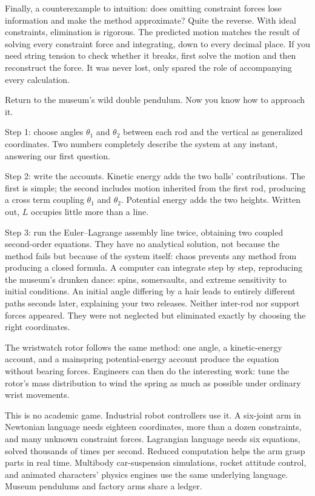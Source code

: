 \begin{mainline}
Finally, a counterexample to intuition: does omitting constraint forces lose information and make the method approximate? Quite the reverse. With ideal constraints, elimination is rigorous. The predicted motion matches the result of solving every constraint force and integrating, down to every decimal place. If you need string tension to check whether it breaks, first solve the motion and then reconstruct the force. It was never lost, only spared the role of accompanying every calculation.
\end{mainline}


\begin{mainline}
Return to the museum's wild double pendulum. Now you know how to approach it.

Step 1: choose angles \(\theta_1\) and \(\theta_2\) between each rod and the vertical as generalized coordinates. Two numbers completely describe the system at any instant, answering our first question.

Step 2: write the accounts. Kinetic energy adds the two balls' contributions. The first is simple; the second includes motion inherited from the first rod, producing a cross term coupling \(\theta_1\) and \(\theta_2\). Potential energy adds the two heights. Written out, \(L\) occupies little more than a line.

Step 3: run the Euler--Lagrange assembly line twice, obtaining two coupled second-order equations. They have no analytical solution, not because the method fails but because of the system itself: chaos prevents any method from producing a closed formula. A computer can integrate step by step, reproducing the museum's drunken dance: spins, somersaults, and extreme sensitivity to initial conditions. An initial angle differing by a hair leads to entirely different paths seconds later, explaining your two releases. Neither inter-rod nor support forces appeared. They were not neglected but eliminated exactly by choosing the right coordinates.

The wristwatch rotor follows the same method: one angle, a kinetic-energy account, and a mainspring potential-energy account produce the equation without bearing forces. Engineers can then do the interesting work: tune the rotor's mass distribution to wind the spring as much as possible under ordinary wrist movements.

This is no academic game. Industrial robot controllers use it. A six-joint arm in Newtonian language needs eighteen coordinates, more than a dozen constraints, and many unknown constraint forces. Lagrangian language needs six equations, solved thousands of times per second. Reduced computation helps the arm grasp parts in real time. Multibody car-suspension simulations, rocket attitude control, and animated characters' physics engines use the same underlying language. Museum pendulums and factory arms share a ledger.


\end{mainline}

